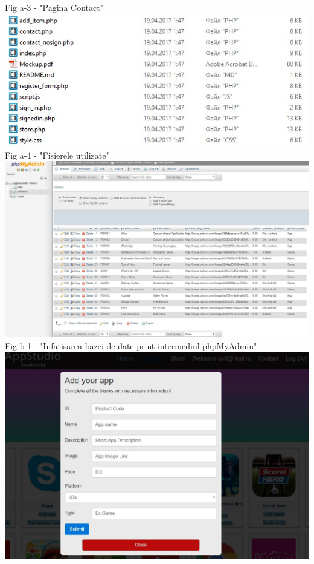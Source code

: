 \begin{center}
Fig a-3 - "Pagina Contact" \\
\vspace{10 mm}
\includegraphics[scale=1]{used_files} \\
Fig a-4 - "Fisierele utilizate" \\
\vspace{10 mm}
\includegraphics[scale=0.45]{phpMyAdmin} \\
Fig b-1 - "Infatisarea bazei de date print intermediul phpMyAdmin" \\
\vspace{10 mm}
\includegraphics[scale=0.55]{addingitems} \\

\end{center}
